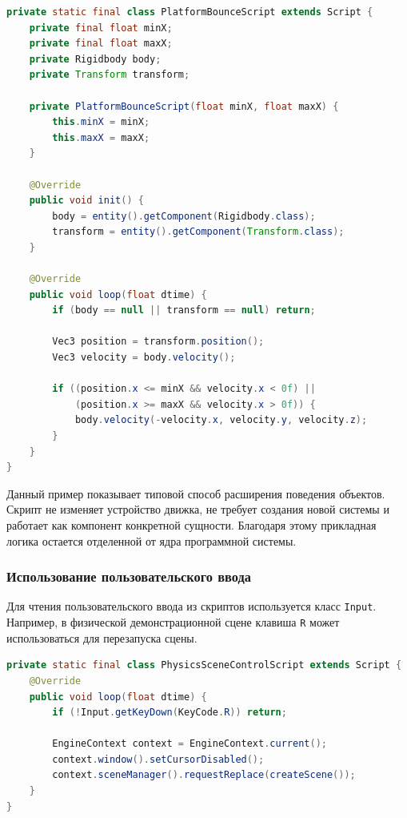 \begin{lstlisting}[language=Java,caption={Пример пользовательского скрипта движения платформы}]
private static final class PlatformBounceScript extends Script {
    private final float minX;
    private final float maxX;
    private Rigidbody body;
    private Transform transform;

    private PlatformBounceScript(float minX, float maxX) {
        this.minX = minX;
        this.maxX = maxX;
    }

    @Override
    public void init() {
        body = entity().getComponent(Rigidbody.class);
        transform = entity().getComponent(Transform.class);
    }

    @Override
    public void loop(float dtime) {
        if (body == null || transform == null) return;

        Vec3 position = transform.position();
        Vec3 velocity = body.velocity();

        if ((position.x <= minX && velocity.x < 0f) ||
            (position.x >= maxX && velocity.x > 0f)) {
            body.velocity(-velocity.x, velocity.y, velocity.z);
        }
    }
}
\end{lstlisting}

Данный пример показывает типовой способ расширения поведения объектов. Скрипт не изменяет устройство движка, не требует создания новой системы и работает как компонент конкретной сущности. Благодаря этому прикладная логика остается отделенной от ядра программной системы.

\subsubsection{Использование пользовательского ввода}

Для чтения пользовательского ввода из скриптов используется класс \texttt{Input}. Например, в физической демонстрационной сцене клавиша \texttt{R} может использоваться для перезапуска сцены.

\begin{lstlisting}[language=Java,caption={Пример обработки нажатия клавиши}]
private static final class PhysicsSceneControlScript extends Script {
    @Override
    public void loop(float dtime) {
        if (!Input.getKeyDown(KeyCode.R)) return;

        EngineContext context = EngineContext.current();
        context.window().setCursorDisabled();
        context.sceneManager().requestReplace(createScene());
    }
}
\end{lstlisting}

